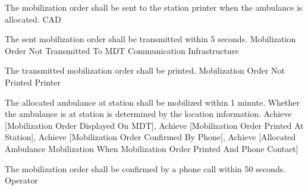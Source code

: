   \startkaosspec
  	 {The mobilization order shall be sent to the station printer when the ambulance is allocated.}
  	 {CAD}
  \stopkaosspec

  \startkaosspec
  	 {The sent mobilization order shall be transmitted within 5 seconds.}
  	 {Mobilization Order Not Transmitted To MDT}
  	 {Communication Infrastructure}
  \stopkaosspec

  \startkaosspec
  	 {The transmitted mobilization order shall be printed.}
  	 {Mobilization Order Not Printed}
  	 {Printer}
  \stopkaosspec
  
  
    {}

  \startkaosspec
  	 {The allocated ambulance at station shall be mobilized within 1 minute. Whether the ambulance is at station is determined by the location information.}
  	 {Achieve [Mobilization Order Displayed On MDT], Achieve [Mobilization Order Printed At Station], Achieve [Mobilization Order Confirmed By Phone], Achieve [Allocated Ambulance Mobilization When Mobilization Order Printed And Phone Contact]}
  \stopkaosspec

  
    {}

  \startkaosspec
  	 {The mobilization order shall be confirmed by a phone call within 50 seconds.}
  	 {Operator}
  \stopkaosspec
  
